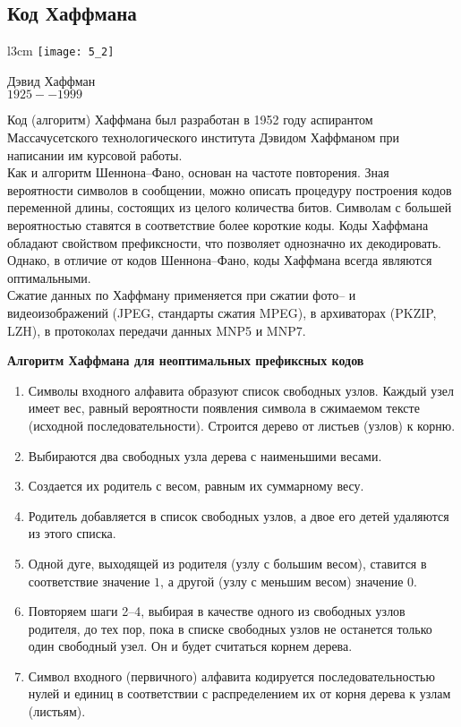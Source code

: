 \subsection{Код Хаффмана}
\begin{wrapfigure}[14]{l}{3cm}
\texttt{[image: 5\_2]}
\begin{center}
\caption{}
\footnotesize{Дэвид Хаффман}
\\\footnotesize{$1925 -- 1999$}
\end{center}
\end{wrapfigure}
Код (алгоритм) Хаффмана был разработан в 1952 году аспирантом Массачусетского технологического института Дэвидом Хаффманом при написании им курсовой работы.
\\Как и алгоритм Шеннона--Фано, основан на частоте повторения. Зная вероятности символов в сообщении, можно описать процедуру построения кодов переменной длины, состоящих из целого количества битов. Символам с большей вероятностью ставятся в соответствие более короткие коды. Коды Хаффмана обладают свойством префиксности, что позволяет однозначно их декодировать.
\\Однако, в отличие от кодов Шеннона--Фано, коды Хаффмана всегда являются оптимальными.
\\Сжатие данных по Хаффману применяется при сжатии фото-- и видеоизображений (JPEG, стандарты сжатия MPEG), в архиваторах (PKZIP, LZH), в протоколах передачи данных MNP5 и MNP7.
\begin{center}
  \textbf{Алгоритм Хаффмана для неоптимальных префиксных кодов}
\end{center}

\begin{enumerate}
  \item Символы входного алфавита образуют список свободных узлов. Каждый узел имеет вес, равный вероятности появления символа в сжимаемом тексте (исходной последовательности). Строится дерево от листьев (узлов) к корню.
  \item Выбираются два свободных узла дерева с наименьшими весами.
  \item Создается их родитель с весом, равным их суммарному весу.
  \item Родитель добавляется в список свободных узлов, а двое его детей удаляются из этого списка.
  \item Одной дуге, выходящей из родителя (узлу с большим весом), ставится в соответствие значение $1$, а другой (узлу с меньшим весом) значение $0$.
  \item Повторяем шаги 2--4, выбирая в качестве одного из свободных узлов родителя, до тех пор, пока в списке свободных узлов не останется только один свободный узел. Он и будет считаться корнем дерева.
  \item Символ входного (первичного) алфавита кодируется последовательностью нулей и единиц в соответствии с распределением их от корня дерева к узлам (листьям).
\end{enumerate}

